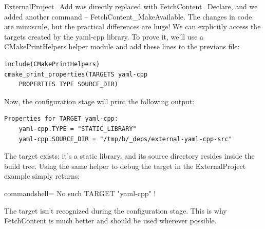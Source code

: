 ExternalProject\_Add was directly replaced with FetchContent\_Declare, and we added another command – FetchContent\_MakeAvailable. The changes in code are minuscule, but the practical differences are huge! We can explicitly access the targets created by the yaml-cpp library. To prove it, we'll use a CMakePrintHelpers helper module and add these lines to the previous file:

\begin{lstlisting}[style=styleCMake]
include(CMakePrintHelpers)
cmake_print_properties(TARGETS yaml-cpp
	PROPERTIES TYPE SOURCE_DIR)
\end{lstlisting} 

Now, the configuration stage will print the following output:

\begin{lstlisting}[style=styleCMake]
Properties for TARGET yaml-cpp:
	yaml-cpp.TYPE = "STATIC_LIBRARY"
	yaml-cpp.SOURCE_DIR = "/tmp/b/_deps/external-yaml-cpp-src"
\end{lstlisting} 

The target exists; it's a static library, and its source directory resides inside the build tree. Using the same helper to debug the target in the ExternalProject example simply returns:

\begin{tcblisting}{commandshell={}}
No such TARGET "yaml-cpp" !
\end{tcblisting}

The target isn't recognized during the configuration stage. This is why FetchContent is much better and should be used wherever possible.




